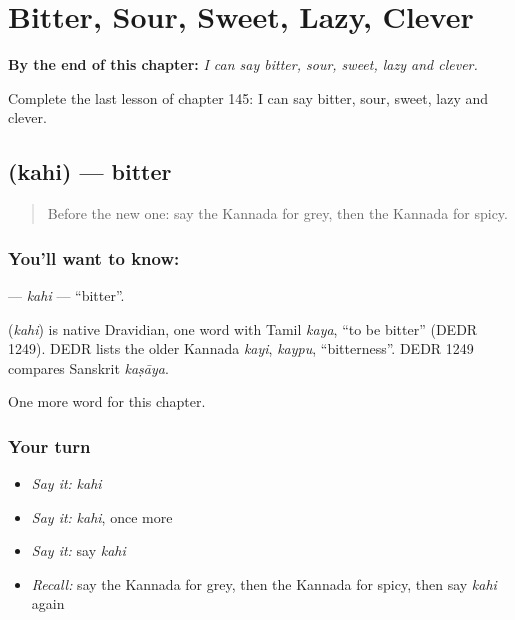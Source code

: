 
\chapter{Bitter, Sour, Sweet, Lazy, Clever}
\label{ch:ka-bitter-sour-sweet-lazy-clever}

\begin{chapteropening}
\textbf{By the end of this chapter:} \emph{I can say bitter, sour, sweet, lazy and clever.}

Complete the last lesson of chapter 145: I can say bitter, sour, sweet, lazy and clever.
\end{chapteropening}

\section[\texorpdfstring{\kn{ಕಹಿ} (kahi)}{ಕಹಿ (kahi)}]{ (kahi) — bitter}

\label{lesson:KA-C145-kahi}



\begin{quote}
Before the new one: say the Kannada for grey, then the Kannada for spicy.
\end{quote}

\subsection*{You'll want to know: }
\textbf{} — \emph{kahi} — \textquotedblleft{}bitter\textquotedblright{}.

\begin{cousinweb}
\textbf{} (\emph{kahi}) is native Dravidian, one word with Tamil \emph{kaya}, \textquotedblleft{}to be bitter\textquotedblright{} (DEDR 1249). DEDR lists the older Kannada \emph{kayi}, \emph{kaypu}, \textquotedblleft{}bitterness\textquotedblright{}. DEDR 1249 compares Sanskrit \emph{kaṣāya}.
\end{cousinweb}

\begin{grammarlens}[title={What you've built}]
One more word for this chapter.
\end{grammarlens}

\subsection*{Your turn}
\begin{itemize}
\raggedright
  \item \emph{Say it:} \emph{kahi}
  \item \emph{Say it:} \emph{kahi}, once more
  \item \emph{Say it:} say \emph{kahi}
  \item \emph{Recall:} say the Kannada for grey, then the Kannada for spicy, then say \emph{kahi} again
\end{itemize}

